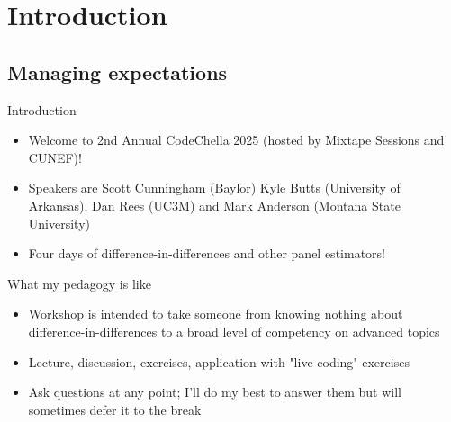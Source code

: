 \documentclass{beamer}
\begin{document}



\section{Introduction}

\subsection{Managing expectations}


\begin{frame}{Introduction}

\begin{itemize}
\item Welcome to 2nd Annual CodeChella 2025 (hosted by Mixtape Sessions and CUNEF)!
\item Speakers are Scott Cunningham (Baylor) Kyle Butts (University of Arkansas), Dan Rees (UC3M) and Mark Anderson (Montana State University)
\item Four days of difference-in-differences and other panel estimators!
\end{itemize}

\end{frame}


\begin{frame}{What my pedagogy is like}

\begin{itemize}
\item Workshop is intended to take someone from knowing nothing about difference-in-differences to a broad level of competency on advanced topics
\item Lecture, discussion, exercises, application with "live coding" exercises
\item Ask questions at any point; I'll do my best to answer them but will sometimes defer it to the break
\end{itemize}

\end{frame}
\end{document}
